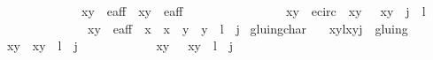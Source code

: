 \begin{isabellebody}
\ \ \ \ \ \ \ \ \ \ \ \ \ \ \ {\isacharparenleft}{\isacharparenleft}x{}{\isacharcomma}y{}{\isacharparenright}\ {\isasymin}\ e{\isacharunderscore}aff\ {\isasymand}\ {\isacharparenleft}x{}{\isacharcomma}y{}{\isacharparenright}\ {\isasymin}\ e{\isacharunderscore}aff{\isacharparenright}\ {\isasymand}\isanewline
\ \ \ \ \ \ \ \ \ \ \ \ \ \ \ {\isacharparenleft}{\isacharparenleft}{\isacharparenleft}x{}{\isacharcomma}y{}{\isacharparenright}\ {\isasymin}\ e{\isacharunderscore}circ\ {\isasymand}\ {\isacharparenleft}x{}{\isacharcomma}y{}{\isacharparenright}\ {\isacharequal}\ {\isasymtau}\ {\isacharparenleft}x{}{\isacharcomma}y{}{\isacharparenright}\ {\isasymand}\ j\ {\isacharequal}\ l{\isacharplus}{}{\isacharparenright}\ {\isasymor}\isanewline
\ \ \ \ \ \ \ \ \ \ \ \ \ \ \ \ {\isacharparenleft}{\isacharparenleft}x{}{\isacharcomma}y{}{\isacharparenright}\ {\isasymin}\ e{\isacharunderscore}aff\ {\isasymand}\ x{}\ {\isacharequal}\ x{}\ {\isasymand}\ y{}\ {\isacharequal}\ y{}\ {\isasymand}\ l\ {\isacharequal}\ j{\isacharparenright}{\isacharparenright}{\isacharbraceright}{\isachardoublequoteclose}\isanewline
\isanewline
{}\isamarkupfalse%
\ gluing{\isacharunderscore}char{\isacharcolon}\isanewline
\ \ \ {\isachardoublequoteopen}{\isacharparenleft}{\isacharparenleft}{\isacharparenleft}x{}{\isacharcomma}y{}{\isacharparenright}{\isacharcomma}l{\isacharparenright}{\isacharcomma}{\isacharparenleft}{\isacharparenleft}x{}{\isacharcomma}y{}{\isacharparenright}{\isacharcomma}j{\isacharparenright}{\isacharparenright}\ {\isasymin}\ gluing{\isachardoublequoteclose}\isanewline
\ \ \ {\isachardoublequoteopen}{\isacharparenleft}{\isacharparenleft}x{}{\isacharcomma}y{}{\isacharparenright}\ {\isacharequal}\ {\isacharparenleft}x{}{\isacharcomma}y{}{\isacharparenright}\ {\isasymand}\ l\ {\isacharequal}\ j{\isacharparenright}\ {\isasymor}\ \isanewline
\ \ \ \ \ \ \ \ \ \ {\isacharparenleft}{\isacharparenleft}x{}{\isacharcomma}y{}{\isacharparenright}\ {\isacharequal}\ {\isasymtau}\ {\isacharparenleft}x{}{\isacharcomma}y{}{\isacharparenright}\ {\isasymand}\ l\ {\isacharequal}\ j{\isacharplus}{}{\isacharparenright}{\isachardoublequoteclose}\isanewline
%
\isadelimproof
\ \ %
\endisadelimproof

\end{isabellebody}
